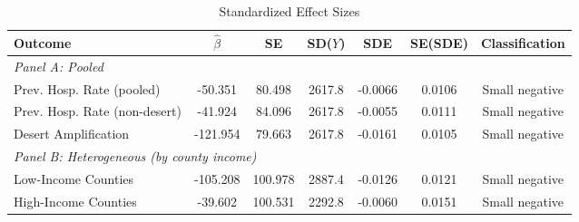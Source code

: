 \begin{table}[htbp]
\centering
\caption{Standardized Effect Sizes}
\label{tab:sde}
\begin{adjustbox}{max width=\textwidth}
\begin{tabular}{lcccccc}
\toprule
Outcome & $\hat{\beta}$ & SE & SD($Y$) & SDE & SE(SDE) & Classification \\
\midrule
\multicolumn{7}{l}{\textit{Panel A: Pooled}} \\
Prev. Hosp. Rate (pooled) & -50.351 & 80.498 & 2617.8 & -0.0066 & 0.0106 & Small negative \\
Prev. Hosp. Rate (non-desert) & -41.924 & 84.096 & 2617.8 & -0.0055 & 0.0111 & Small negative \\
Desert Amplification & -121.954 & 79.663 & 2617.8 & -0.0161 & 0.0105 & Small negative \\
\midrule
\multicolumn{7}{l}{\textit{Panel B: Heterogeneous (by county income)}} \\
Low-Income Counties & -105.208 & 100.978 & 2887.4 & -0.0126 & 0.0121 & Small negative \\
High-Income Counties & -39.602 & 100.531 & 2292.8 & -0.0060 & 0.0151 & Small negative \\
\bottomrule
\end{tabular}
\end{adjustbox}
\begin{tablenotes}[flushleft]
\small

\end{tablenotes}
\end{table}
